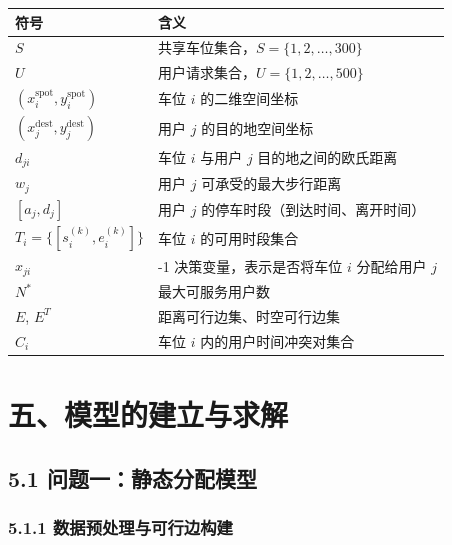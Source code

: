 \documentclass{ctexart}
\begin{document}
\begin{table}[H]
  \centering
  \begin{tabular}{@{}>{\centering}m{3.5cm}>{\centering\arraybackslash}m{10cm}@{}}
    \toprule
    符号                                       & 含义                             \\
    \midrule
    $S$                                      & 共享车位集合，$S = \{1,2,\dots,300\}$ \\
    $U$                                      & 用户请求集合，$U = \{1,2,\dots,500\}$ \\
    $(x_i^{\text{spot}}, y_i^{\text{spot}})$ & 车位 $i$ 的二维空间坐标                 \\
    $(x_j^{\text{dest}}, y_j^{\text{dest}})$ & 用户 $j$ 的目的地空间坐标                \\
    $d_{ji}$                                 & 车位 $i$ 与用户 $j$ 目的地之间的欧氏距离      \\
    $w_j$                                    & 用户 $j$ 可承受的最大步行距离              \\
    $[a_j, d_j]$                             & 用户 $j$ 的停车时段（到达时间、离开时间）        \\
    $T_i = \{[s_i^{(k)}, e_i^{(k)}]\}$       & 车位 $i$ 的可用时段集合                 \\
    $x_{ji}$                                 & 0-1 决策变量，表示是否将车位 $i$ 分配给用户 $j$ \\
    $N^*$                                    & 最大可服务用户数                       \\
    $E$, $E^T$                               & 距离可行边集、时空可行边集                  \\
    $C_i$                                    & 车位 $i$ 内的用户时间冲突对集合             \\
    \bottomrule
  \end{tabular}
\end{table}

\section*{五、模型的建立与求解}

\subsection*{5.1 问题一：静态分配模型}

\subsubsection*{5.1.1 数据预处理与可行边构建}
\end{document}
